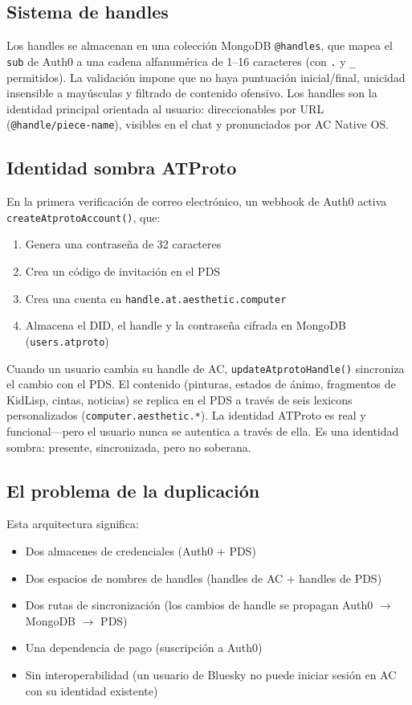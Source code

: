 \documentclass[10pt,letterpaper,twocolumn]{article}
\begin{document}
\subsection{Sistema de handles}

Los handles se almacenan en una colección MongoDB \texttt{@handles}, que mapea el \texttt{sub} de Auth0 a una cadena alfanumérica de 1--16 caracteres (con \texttt{.} y \texttt{\_} permitidos). La validación impone que no haya puntuación inicial/final, unicidad insensible a mayúsculas y filtrado de contenido ofensivo. Los handles son la identidad principal orientada al usuario: direccionables por URL (\texttt{@handle/piece-name}), visibles en el chat y pronunciados por AC Native OS.

\subsection{Identidad sombra ATProto}

En la primera verificación de correo electrónico, un webhook de Auth0 activa \texttt{createAtprotoAccount()}, que:

\begin{enumerate}
  \item Genera una contraseña de 32 caracteres
  \item Crea un código de invitación en el PDS
  \item Crea una cuenta en \texttt{handle.at.aesthetic.computer}
  \item Almacena el DID, el handle y la contraseña cifrada en MongoDB (\texttt{users.atproto})
\end{enumerate}

Cuando un usuario cambia su handle de AC, \texttt{updateAtprotoHandle()} sincroniza el cambio con el PDS. El contenido (pinturas, estados de ánimo, fragmentos de KidLisp, cintas, noticias) se replica en el PDS a través de seis lexicons personalizados (\texttt{computer.aesthetic.*}). La identidad ATProto es real y funcional---pero el usuario nunca se autentica a través de ella. Es una identidad sombra: presente, sincronizada, pero no soberana.

\subsection{El problema de la duplicación}

Esta arquitectura significa:

\begin{itemize}
  \item Dos almacenes de credenciales (Auth0 + PDS)
  \item Dos espacios de nombres de handles (handles de AC + handles de PDS)
  \item Dos rutas de sincronización (los cambios de handle se propagan Auth0 $\to$ MongoDB $\to$ PDS)
  \item Una dependencia de pago (suscripción a Auth0)
  \item Sin interoperabilidad (un usuario de Bluesky no puede iniciar sesión en AC con su identidad existente)
\end{itemize}
\end{document}
